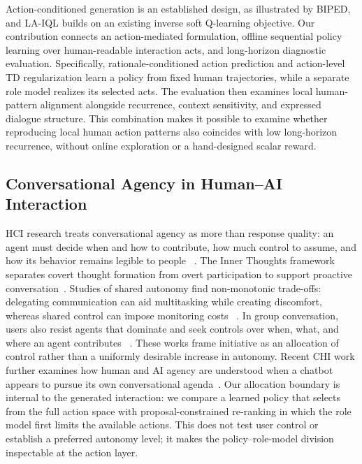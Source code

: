 \documentclass[manuscript,review,anonymous]{acmart}
\begin{document}
Action-conditioned generation is an established design, as illustrated by
BIPED, and LA-IQL builds on an existing inverse soft Q-learning objective.
Our contribution connects an action-mediated formulation, offline sequential
policy learning over human-readable interaction acts, and long-horizon
diagnostic evaluation. Specifically, rationale-conditioned action prediction
and action-level TD regularization learn a policy from fixed human trajectories,
while a separate role model realizes its selected acts. The evaluation then
examines local human-pattern alignment alongside recurrence, context
sensitivity, and expressed dialogue structure. This combination makes it
possible to examine whether reproducing local human action patterns also
coincides with low long-horizon recurrence, without online exploration or
a hand-designed scalar reward.

\subsection{Conversational Agency in Human--AI Interaction}

HCI research treats conversational agency as more than response quality: an
agent must decide when and how to contribute, how much control to assume, and
how its behavior remains legible to people
~\citep{horvitz1999mixed,amershi2019guidelines,clark2019conversation}. The Inner Thoughts framework
separates covert thought formation from overt participation to support
proactive conversation~\citep{liu2025proactive}. Studies of shared autonomy find
non-monotonic trade-offs: delegating communication can aid multitasking while
creating discomfort, whereas shared control can impose monitoring costs
~\citep{cheng2025surrogates}. In group conversation, users also resist agents
that dominate and seek controls over when, what, and where an agent contributes
~\citep{houde2025controlling}. These works frame initiative as an allocation of
control rather than a uniformly desirable increase in autonomy. Recent CHI
work further examines how human and AI agency are understood when a chatbot
appears to pursue its own conversational agenda~\citep{yun2026agenda}. Our allocation
boundary is internal to the generated interaction: we compare a learned policy
that selects from the full action space with proposal-constrained re-ranking in
which the role model first limits the available actions. This does not test user
control or establish a preferred autonomy level; it makes the policy--role-model
division inspectable at the action layer.
\end{document}
